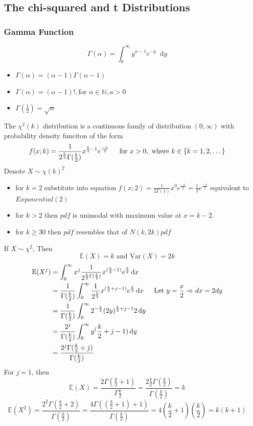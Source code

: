 \documentclass{article}
\newcommand{\N}{\mathbb{N}}
\newcommand{\E}{\mathbb{E}}
\newcommand{\Var}{\mathrm{Var}}
\newcommand{\sqr}[1]{{#1}^2}
\newcommand{\uint}[4]{\int_{#1}^{#2} #3 \dd #4}
\newcommand{\dd}{\mathop{}\!\mathrm{d}}
\begin{document}
\subsection{The chi-squared and t Distributions}
\subsubsection{Gamma Function}

\[
\Gamma(\alpha) = \uint{0}{\infty}{y^{\alpha - 1}e^{-y}}{y}
\]
\begin{itemize}
    \item $\Gamma(\alpha) = (\alpha - 1)\Gamma(\alpha - 1)$
    \item $\Gamma(\alpha) = (\alpha - 1)! , \text{for } \alpha \in \N, a > 0$
    \item $\Gamma(\frac{1}{2}) = \sqrt{n}$
\end{itemize}
The $\sqr{\chi}(k)$ distribution is a continuous family of distribution $(0, \infty)$ with probability density funciton of the form
\[
f(x;k) = \frac{1}{2^{\frac{k}{2}}\Gamma(\frac{k}{2})}x^{\frac{k}{2} - 1}e^{\frac{-x}{2}} \indent \text{for } x > 0, \text{ where } k \in \left\{k = 1, 2, \dotsc\right\}
\]
Denote $X \sim \sqr{\chi(k)}$
\begin{itemize}
    \item for $k = 2$ substitute into equation $f(x; 2) = \frac{1}{2\Gamma(1)}x^0e^{\frac{-x}{2}} = \frac{1}{2}e^{\frac{-x}{2}}$ equivalent to $Exponential(2)$ 
    \item for $k > 2$ then $pdf$ is unimodal with maximum value at $x= k - 2$.
    \item for $k \ge 30$  then $pdf$ resembles that of $N(k, 2k) pdf$ 
\end{itemize}
If $X \sim \sqr{\chi}$, Then
\[
\E(X) = k  \text{ and } \Var(X) = 2k
\]
\begin{align*}
    \E(X^j) &= \uint{0}{\infty}{x^j\frac{1}{2^{\frac{k}{2}\Gamma(\frac{k}{2})}}x^{(\frac{k}{2} -1)}e^{\frac{k}{2}}}{x}\\
    &= \frac{1}{\Gamma(\frac{k}{2})}\uint{0}{\infty}{\frac{1}{2^{\frac{k}{2}}}x^{(\frac{k}{2}+j - 1)}e^{\frac{k}{2}}}{x} \indent \text{Let } y = \frac{x}{2} \Rightarrow dx = 2dy\\
    &= \frac{1}{\Gamma(\frac{k}{2})}\uint{0}{\infty}{2^{-\frac{k}{2}}(2y)^{\frac{k}{2} + j - 1}2}{y}\\
    &= \frac{2^j}{\Gamma(\frac{k}{2})}\uint{0}{\infty}{y^(\frac{k}{2}+ j - 1)}{y}\\
    &= \frac{2^j \Gamma(\frac{k}{2} + j)}{\Gamma(\frac{k}{2})}
\end{align*}
For $j = 1$, then 
\[
\E(X) = \frac{2\Gamma(\frac{k}{2} +1)}{\Gamma{\frac{k}{2}}} = \frac{2 \frac{k}{2} \Gamma(\frac{k}{2})}{\Gamma(\frac{k}{2})} = k
\]
\[
\E(\sqr{X}) = \frac{2^2 \Gamma(\frac{k}{2} + 2)}{\Gamma(\frac{k}{2})} = \frac{4 \Gamma((\frac{k}{2} + 1) + 1)}{\Gamma(\frac{k}{2})} = 4(\frac{k}{2} + 1)(\frac{k}{2}) = k(k+ 1)
\]
\end{document}
